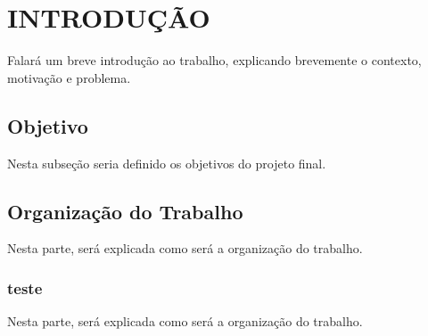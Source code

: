 \chapter{INTRODUÇÃO}\label{chp:INTRODUCAO}

Falará um breve introdução ao trabalho, explicando brevemente o contexto, motivação e problema.

\section{Objetivo}

Nesta subseção seria definido os objetivos do projeto final.

\section{Organização do Trabalho}

Nesta parte, será explicada como será a organização do trabalho.
\subsection{teste}
Nesta parte, será explicada como será a organização do trabalho.
